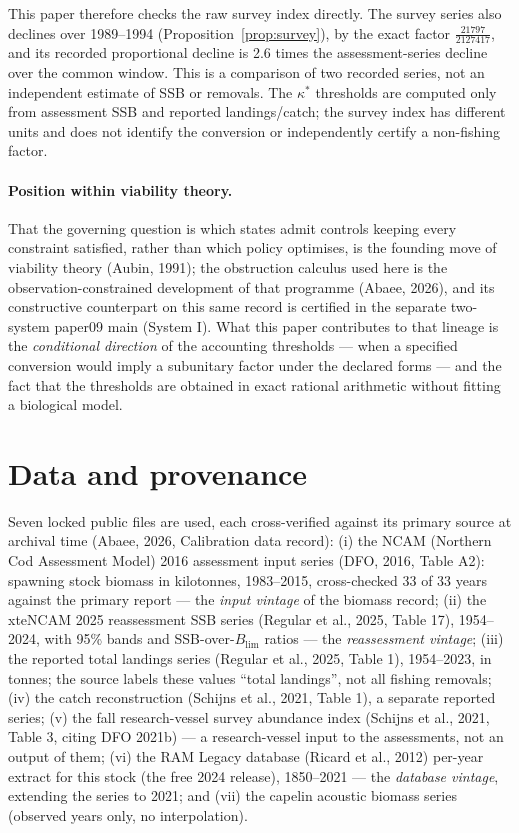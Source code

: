\documentclass[10pt,twocolumn]{article}
\theoremstyle{plain}
\theoremstyle{remark}
\begin{document}
This paper therefore checks the raw survey index directly. The survey
series also declines over 1989--1994 (Proposition~\ref{prop:survey}),
by the exact factor \(\tfrac{21797}{2127417}\), and its recorded
proportional decline is 2.6 times the assessment-series decline over
the common window. This is a comparison of two recorded series, not an
independent estimate of SSB or removals. The \(\kappa^*\) thresholds
are computed only from assessment SSB and reported landings/catch; the
survey index has different units and does not identify the conversion
or independently certify a non-fishing factor.

\paragraph{Position within viability theory.} That the governing question is which states
admit controls keeping every constraint satisfied, rather than which policy optimises, is the
founding move of viability theory (Aubin, 1991); the obstruction calculus used here is the
observation-constrained development of that programme (Abaee, 2026), and its constructive
counterpart on this same record is certified in the separate two-system paper09 main (System I). What this paper
contributes to that lineage is the \emph{conditional direction} of the
accounting thresholds --- when a specified conversion would imply a
subunitary factor under the declared forms --- and the fact that the
thresholds are obtained in exact rational arithmetic without fitting a
biological model.

\section{Data and provenance}\label{data}

Seven locked public files are used, each cross-verified against its
primary source at archival time (Abaee, 2026, Calibration data record): (i) the NCAM (Northern Cod Assessment Model) 2016
assessment input series (DFO, 2016, Table A2): spawning stock biomass
in kilotonnes, 1983--2015, cross-checked 33 of 33 years against the
primary report --- the \emph{input vintage} of the biomass record;
(ii) the xteNCAM 2025 reassessment SSB series (Regular et al., 2025,
Table 17), 1954--2024, with 95\% bands and SSB-over-\(B_{\mathrm{lim}}\)
ratios --- the \emph{reassessment vintage}; (iii) the reported total
landings series (Regular et al., 2025, Table 1), 1954--2023, in tonnes;
the source labels these values ``total landings'', not all fishing
removals; (iv) the catch reconstruction (Schijns et al., 2021, Table 1),
a separate reported series; (v) the fall research-vessel survey
abundance index (Schijns et al., 2021, Table 3, citing DFO 2021b) --- a
research-vessel input to the assessments, not an output of them; (vi)
the RAM Legacy database (Ricard et al., 2012) per-year extract for this
stock (the free 2024 release), 1850--2021 --- the \emph{database
vintage}, extending the series to 2021; and (vii) the capelin acoustic
biomass series (observed years only, no interpolation).
\end{document}
